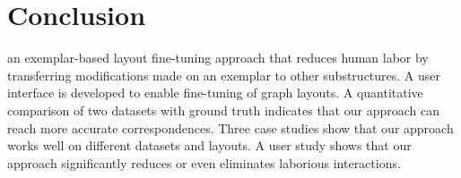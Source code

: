 \section{Conclusion}
 an exemplar-based  layout fine-tuning approach that reduces human labor by transferring modifications made on an exemplar to other substructures. 
A user interface is developed to enable fine-tuning of graph layouts.
A quantitative comparison of two datasets with ground truth indicates that our approach can reach more accurate correspondences. Three case studies show that our approach works well on different datasets and layouts. A user study shows that our approach significantly reduces or even eliminates laborious interactions.